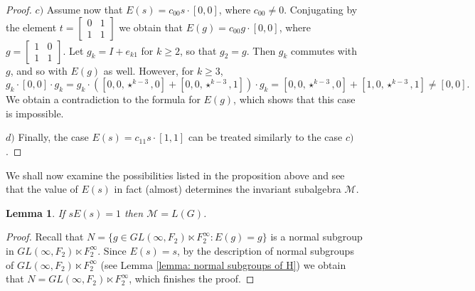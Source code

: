 \documentclass[11pt]{amsart}
\theoremstyle{plain}
\newtheorem{lemma}[theorem]{Lemma}
\theoremstyle{definition}
\theoremstyle{remark}
\numberwithin{equation}{section}
\begin{document}
\begin{proof}
 
 \smallskip \noindent $c)$ Assume now that $E(s)=c_{00}s\cdot [0,0]$, where $c_{00}\neq 0$. Conjugating by the element $t=\begin{bmatrix}
 	0&1\\1&1
 \end{bmatrix}$ we obtain that $E(g)=c_{00}g\cdot [0,0]$, where $g=\begin{bmatrix}
 	1&0\\1&1
 \end{bmatrix}$. Let $g_k=I+e_{k1}$ for $k\geqslant 2$, so that $g_2=g$. Then $g_k$ commutes with $g$, and so with $E(g)$ as well. However, for $k\geqslant 3$, $$g_k\cdot [0,0]\cdot g_k= g_k\cdot ([0,0,\star^{k-3},0]+[0,0,\star^{k-3},1])\cdot g_k=[0,0,\star^{k-3},0]+[1,0,\star^{k-3},1]\neq [0,0].$$
  We obtain a contradiction to the formula for $E(g)$, which shows that this case is impossible.

\smallskip \noindent $d)$ Finally, the case $E(s)=c_{11}s\cdot [1,1]$ can be treated similarly to the case $c)$.

\end{proof}	



We shall now examine the possibilities listed in the proposition above and see that the value of $E(s)$ in fact (almost) determines the invariant subalgebra $\mathcal M$.

\begin{lemma}\label{prop: (01 10)E((01 10))=1}
 If $s E(s)=1$ then $\mathcal M=L(G)$.
\end{lemma}
\begin{proof}
	Recall that $N=\{g\in GL(\infty,F_2)\ltimes F_2^\infty:E(g)=g\}$ is a normal subgroup in $GL(\infty,F_2)\ltimes F_2^\infty$. Since $E(s)=s$, by the description of normal subgroups of $GL(\infty,F_2)\ltimes F_2^\infty$ (see Lemma \ref{lemma: normal subgroups of H}) we obtain that $N=GL(\infty,F_2)\ltimes F_2^\infty$, which finishes the proof.
\end{proof}
\end{document}
